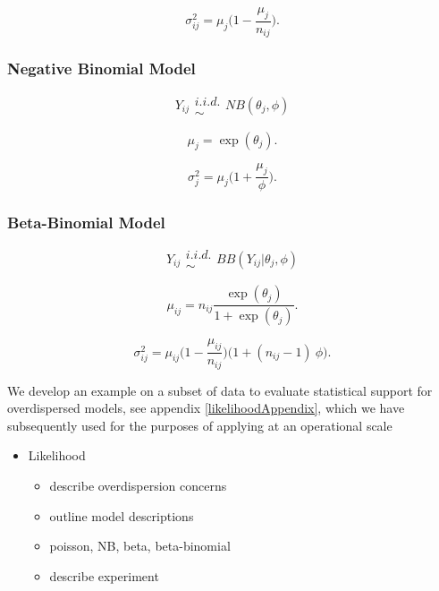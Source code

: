 \documentclass[12pt]{article}
\begin{document}
%
\begin{equation}
\sigma^2_{ij} = \mu_{j}\Big(1-\frac{\mu_{j}}{n_{ij}}\Big).
\end{equation}

%
\subsubsection{Negative Binomial Model}

%
\begin{equation}
Y_{ij} \substack{i.i.d.\\\sim} NB(\theta_{j}, \phi)
\end{equation}

%
\begin{equation}
\mu_{j} = \exp(\theta_{j}). %
\end{equation}

%
\begin{equation}
\sigma^2_{j} = \mu_{j}\Big(1+\frac{\mu_{j}}{\phi}\Big).
\end{equation}

%
\subsubsection{Beta-Binomial Model}

%
\begin{equation}
Y_{ij} \substack{i.i.d.\\\sim} BB(Y_{ij}|\theta_{j}, \phi)
\end{equation}

%
\begin{equation}
\mu_{ij} = n_{ij}\frac{\exp(\theta_{j})}{1+\exp(\theta_{j})}.
\end{equation}

%
\begin{equation}
\sigma^2_{ij} = \mu_{ij}\Big(1-\frac{\mu_{ij}}{n_{ij}}\Big)\Big(1+(n_{ij}-1)~\phi\Big).
\end{equation}


We develop an example on a subset of data to evaluate statistical support for 
overdispersed models, see appendix \ref{likelihoodAppendix}, which we have subsequently used for the purposes of applying at an operational scale 

\begin{itemize}
\item Likelihood
	\begin{itemize}
	\item describe overdispersion concerns
	\item outline model descriptions
	\item poisson, NB, beta, beta-binomial
	\item describe experiment
	\end{itemize}
\end{itemize}
\end{document}

